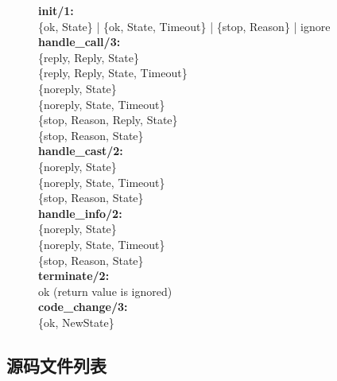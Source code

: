 \documentclass[a4paper,11pt]{article}
\begin{document}
\begin{figure}[H]
\centering
\begin{tcolorbox}[colback=codebg, colframe=codeborder, arc=2mm, boxrule=0.5pt,
                  title={\textbf{Callback Return Values Quick Reference}},
                  fonttitle=\bfseries\ttfamily, width=\textwidth]
\small\ttfamily
\textbf{init/1:} \\
\quad \{ok, State\} | \{ok, State, Timeout\} | \{stop, Reason\} | ignore \\[6pt]
\textbf{handle\_call/3:} \\
\quad \{reply, Reply, State\} \\
\quad \{reply, Reply, State, Timeout\} \\
\quad \{noreply, State\} \\
\quad \{noreply, State, Timeout\} \\
\quad \{stop, Reason, Reply, State\} \\
\quad \{stop, Reason, State\} \\[6pt]
\textbf{handle\_cast/2:} \\
\quad \{noreply, State\} \\
\quad \{noreply, State, Timeout\} \\
\quad \{stop, Reason, State\} \\[6pt]
\textbf{handle\_info/2:} \\
\quad \{noreply, State\} \\
\quad \{noreply, State, Timeout\} \\
\quad \{stop, Reason, State\} \\[6pt]
\textbf{terminate/2:} \\
\quad ok \quad (return value is ignored) \\[6pt]
\textbf{code\_change/3:} \\
\quad \{ok, NewState\}
\end{tcolorbox}
\end{figure}

\subsection{源码文件列表}
\end{document}
